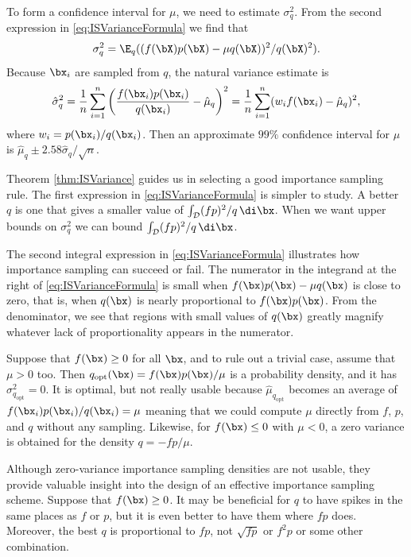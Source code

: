 To form a confidence interval for $\mu$, we need to estimate $\sigma_q^2$. From the second expression in \eqref{eq:ISVarianceFormula} we find that
\[
	\sigma_q^2 = \E_q((f(\bX)p(\bX) - \mu q(\bX))^2 / q(\bX)^2).
\]
Because $\bx_i$ are sampled from $q$, the natural variance estimate is
\begin{equation}
	\hat{\sigma}_q^2 = \frac{1}{n} \sum_{i=1}^n \left( \frac{f(\bx_i)p(\bx_i)}{q(\bx_i)} - \hat{\mu}_q \right)^2 = \frac{1}{n} \sum_{i=1}^n (w_i f(\bx_i) - \hat{\mu}_q)^2,
	\label{eq:ISVarianceEstimator}
\end{equation}
where $w_i = p(\bx_i)/q(\bx_i)$. Then an approximate $99\%$ confidence interval for $\mu$ is $\hat{\mu}_q \pm 2.58 \hat{\sigma}_q / \sqrt{n}$.

Theorem \ref{thm:ISVariance} guides us in selecting a good importance sampling rule. The first expression in \eqref{eq:ISVarianceFormula} is simpler to study. A better $q$ is one that gives a smaller value of $\int_{\mathcal{D}} (fp)^2/q \, \di \bx$. When we want upper bounds on $\sigma_q^2$ we can bound $\int_{\mathcal{D}} (fp)^2/q \, \di \bx$.

The second integral expression in \eqref{eq:ISVarianceFormula} illustrates how importance sampling can succeed or fail. The numerator in the integrand at the right of \eqref{eq:ISVarianceFormula} is small when $f(\bx)p(\bx) - \mu q(\bx)$ is close to zero, that is, when $q(\bx)$ is nearly proportional to $f(\bx)p(\bx)$. From the denominator, we see that regions with small values of $q(\bx)$ greatly magnify whatever lack of proportionality appears in the numerator.

Suppose that $f(\bx) \geq 0$ for all $\bx$, and to rule out a trivial case, assume that $\mu > 0$ too. Then $q_{\mathrm{opt}}(\bx) = f(\bx)p(\bx)/\mu$ is a probability density, and it has $\sigma_{q_{\mathrm{opt}}}^2 = 0$. It is optimal, but not really usable because $\hat{\mu}_{q_{\mathrm{opt}}}$ becomes an average of $f(\bx_i)p(\bx_i)/q(\bx_i) = \mu$ meaning that we could compute $\mu$ directly from $f$, $p$, and $q$ without any sampling. Likewise, for $f(\bx) \leq 0$ with $\mu < 0$, a zero variance is obtained for the density $q = -fp/\mu$.

Although zero-variance importance sampling densities are not usable, they provide valuable insight into the design of an effective importance sampling scheme. Suppose that $f(\bx) \ge 0$. It may be beneficial for $q$ to have spikes in the same places as $f$ or $p$, but it is even better to have them where $fp$ does. Moreover, the best $q$ is proportional to $fp$, not $\sqrt{fp}$ or $f^2p$ or some other combination.

